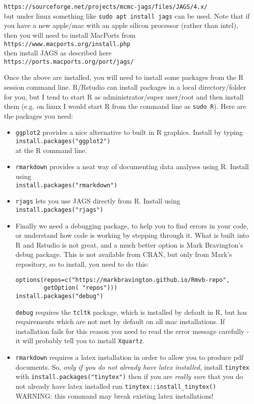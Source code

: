 \documentclass[10pt] {article}
\theoremstyle{definition}
\begin{document}
\begin{itemize}
\lstinline+https://sourceforge.net/projects/mcmc-jags/files/JAGS/4.x/+\\
but under linux something like \lstinline+sudo apt install jags+ can be used. Note that if you have a new apple/mac with an apple silicon processor (rather than intel), then you will need to install MacPorts from\\ 
\lstinline+https://www.macports.org/install.php+\\
then install JAGS as described here\\
\lstinline+https://ports.macports.org/port/jags/+
\end{itemize}

Once the above are installed, you will need to install some packages from the R session command line. R/Rstudio can install packages in a local directory/folder for you, but I tend to start R as administrator/super user/root and then install them (e.g. on linux I would start R from the command line as \lstinline+sudo R+). Here are the packages you need:
\begin{itemize}
\item {\tt ggplot2} provides a nice alternative to built in R graphics. Install by typing\\
\lstinline+install.packages("ggplot2")+\\
at the R command line.
\item {\tt rmarkdown} provides a neat way of documenting data analyses using R. Install using\\
 \lstinline+install.packages("rmarkdown")+
\item {\tt rjags} lets you use JAGS directly from R. Install using\\
 \lstinline+install.packages("rjags")+
\item Finally we need a debugging package, to help you to find errors in your code, or understand how code is working by stepping through it. What is built into R and Rstudio is not great, and a much better option is Mark Bravington's debug package. This is not available from CRAN, but only from Mark's repository, so to install, you need to do this:
\begin{lstlisting}
options(repos=c("https://markbravington.github.io/Rmvb-repo",
        getOption( "repos")))
install.packages("debug")
\end{lstlisting}
{\tt debug} requires the {\tt tcltk} package, which is installed by default in R, but has requirements which are not met by default on all mac installations. If installation fails for this reason you need to read the error message carefully - it will probably tell you to install {\tt Xquartz}.

\item {\tt rmarkdown} requires a latex installation in order to allow you to produce pdf documents. So, {\em only if you do not already have latex installed}, install {\tt tinytex} with
\lstinline+install.packages("tinytex")+
then if you are {\em really sure} that you do not already have latex installed run 
\lstinline+tinytex::install_tinytex()+
WARNING: this command may break existing latex installations!
\end{itemize}
\end{document}
